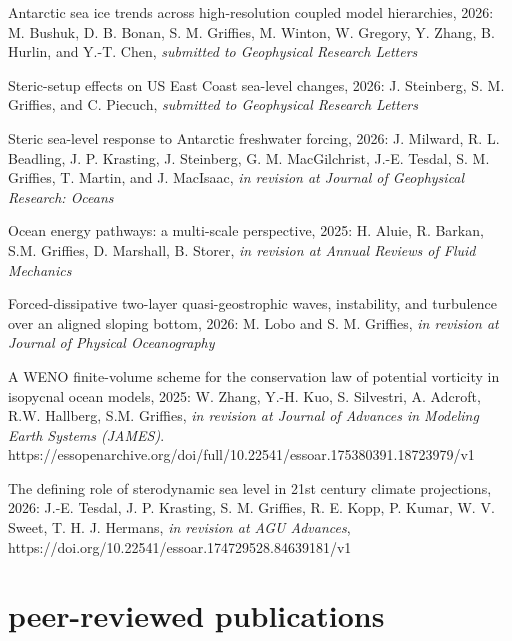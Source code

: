 \begin{etaremune}
\item Antarctic sea ice trends across high-resolution coupled model hierarchies, 2026: M. Bushuk, D. B. Bonan,  S. M. Grif\/f\/ies, M. Winton, W. Gregory, Y. Zhang, B. Hurlin, and Y.-T. Chen, {\it submitted to Geophysical Research Letters}

\item Steric-setup effects on US East Coast sea-level changes, 2026: J. Steinberg, S. M. Grif\/f\/ies, and C. Piecuch, {\it submitted to Geophysical Research Letters}

\item Steric sea-level response to Antarctic freshwater forcing, 2026: J. Milward, R. L. Beadling, J. P. Krasting, J. Steinberg, G. M. MacGilchrist, J.-E. Tesdal, S. M. Griffies, T. Martin, and J. MacIsaac, {\it in revision at Journal of Geophysical Research: Oceans}

\item Ocean energy pathways: a multi-scale perspective, 2025: H. Aluie, R. Barkan, S.M. Grif\/f\/ies, D. Marshall, B. Storer, {\it in revision at Annual Reviews of Fluid Mechanics}

\item Forced-dissipative two-layer quasi-geostrophic waves, instability, and turbulence over an aligned sloping bottom, 2026: M. Lobo and S. M. Griffies, {\it in revision at Journal of Physical Oceanography}

\item A WENO finite-volume scheme for the conservation law of potential vorticity in isopycnal ocean models, 2025: W. Zhang, Y.-H. Kuo, S. Silvestri, A. Adcroft, R.W. Hallberg, S.M. Griffies, {\it in revision at  Journal of Advances in Modeling Earth Systems (JAMES)}. https://essopenarchive.org/doi/full/10.22541/essoar.175380391.18723979/v1

\item The defining role of sterodynamic sea level in 21st century climate projections, 2026: J.-E. Tesdal, J. P. Krasting, S. M. Griffies, R. E. Kopp, P.  Kumar,  W. V. Sweet, T. H. J. Hermans, {\it in revision at  AGU Advances}, https://doi.org/10.22541/essoar.174729528.84639181/v1


\end{etaremune}


\section*{\sc \color{Maroon} peer-reviewed publications}

